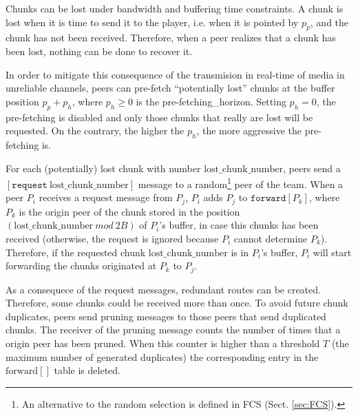 

\label{sec:routes_discovery}

Chunks can be lost under bandwidth and buffering time constraints. A
chunk is lost when it is time to send it to the player, i.e. when it
is pointed by $p_p$, and the chunk has not been received. Therefore,
when a peer realizes that a chunk has been lost, nothing can be done
to recover it.

In order to mitigate this consequence of the transmision in real-time
of media in unreliable channels, peers can pre-fetch ``potentially
lost'' chunks at the buffer position $p_p+p_h$, where $p_h\geq 0$ is
the \gls{pre-fetching_horizon}. Setting $p_h=0$, the pre-fetching is
disabled and only those chunks that really are lost will be requested.
On the contrary, the higher the $p_h$, the more aggressive the
pre-fetching is.


For each (potentially) lost chunk with number
$\text{lost\_chunk\_number}$, peers send a
$[\mathtt{request}~\text{lost\_chunk\_number}]$ message to a
random\footnote{An alternative to the random selection is defined in
  FCS (Sect. \ref{sec:FCS}).} peer of the team. When a peer $P_i$
receives a request message from $P_j$, $P_i$ adds $P_j$ to
$\mathtt{forward}[P_k]$, where $P_k$ is the origin peer of the chunk
stored in the position $(\text{lost\_chunk\_number}~\mathit{mod}~2B)$
of $P_i$'s buffer, in case this chunks has been received (otherwise,
the request is ignored because $P_i$ cannot determine
$P_k$). Therefore, if the requested chunk $\text{lost\_chunk\_number}$
is in $P_i$'s buffer, $P_i$ will start forwarding the chunks
originated at $P_k$ to $P_j$.

As a consequece of the request messages, redundant routes can be
created. Therefore, some chunks could be received more than once. To
avoid future chunk duplicates, peers send pruning messages to those
peers that send duplicated chunks. The receiver of the pruning message
counts the number of times that a origin peer has been  pruned. When this counter is higher than a threshold $T$ (the
maximum number of generated duplicates) the corresponding entry in the
$\text{forward}[]$ table is deleted.  

